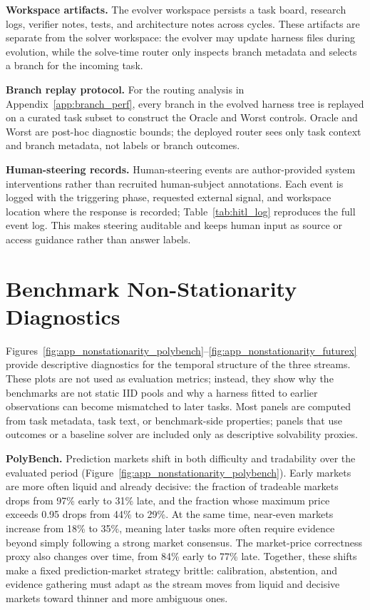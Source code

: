 \documentclass[11pt]{article}
\theoremstyle{plain}
\begin{document}
\noindent\textbf{Workspace artifacts.}
The evolver workspace persists a task board, research logs, verifier notes, tests, and architecture notes across cycles. These artifacts are separate from the solver workspace: the evolver may update harness files during evolution, while the solve-time router only inspects branch metadata and selects a branch for the incoming task.

\noindent\textbf{Branch replay protocol.}
For the routing analysis in Appendix~\ref{app:branch_perf}, every branch in the evolved harness tree is replayed on a curated task subset to construct the Oracle and Worst controls. Oracle and Worst are post-hoc diagnostic bounds; the deployed router sees only task context and branch metadata, not labels or branch outcomes.

\noindent\textbf{Human-steering records.}
Human-steering events are author-provided system interventions rather than recruited human-subject annotations. Each event is logged with the triggering phase, requested external signal, and workspace location where the response is recorded; Table~\ref{tab:hitl_log} reproduces the full event log. This makes steering auditable and keeps human input as source or access guidance rather than answer labels.

\section{Benchmark Non-Stationarity Diagnostics}
\label{app:nonstationarity}

Figures~\ref{fig:app_nonstationarity_polybench}--\ref{fig:app_nonstationarity_futurex} provide descriptive diagnostics for the temporal structure of the three streams. These plots are not used as evaluation metrics; instead, they show why the benchmarks are not static IID pools and why a harness fitted to earlier observations can become mismatched to later tasks. Most panels are computed from task metadata, task text, or benchmark-side properties; panels that use outcomes or a baseline solver are included only as descriptive solvability proxies.

\noindent\textbf{PolyBench.}
Prediction markets shift in both difficulty and tradability over the evaluated period (Figure~\ref{fig:app_nonstationarity_polybench}). Early markets are more often liquid and already decisive: the fraction of tradeable markets drops from 97\% early to 31\% late, and the fraction whose maximum price exceeds 0.95 drops from 44\% to 29\%. At the same time, near-even markets increase from 18\% to 35\%, meaning later tasks more often require evidence beyond simply following a strong market consensus. The market-price correctness proxy also changes over time, from 84\% early to 77\% late. Together, these shifts make a fixed prediction-market strategy brittle: calibration, abstention, and evidence gathering must adapt as the stream moves from liquid and decisive markets toward thinner and more ambiguous ones.
\end{document}
